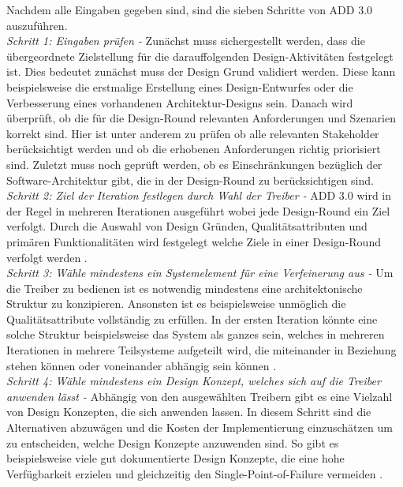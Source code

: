 Nachdem alle Eingaben gegeben sind, sind die sieben Schritte von ADD 3.0 auszuf\"uhren.\\

\emph{Schritt 1: Eingaben pr\"ufen -}
Zun\"achst muss sichergestellt werden, dass die \"ubergeordnete Zielstellung f\"ur die darauffolgenden Design-Aktivit\"aten festgelegt ist. Dies bedeutet zun\"achst muss der Design Grund validiert werden. Diese kann beispielsweise die erstmalige Erstellung eines Design-Entwurfes oder die Verbesserung eines vorhandenen Architektur-Designs sein. Danach wird \"uberpr\"uft, ob die f\"ur die Design-Round relevanten Anforderungen und Szenarien korrekt sind. Hier ist unter anderem zu pr\"ufen ob alle relevanten Stakeholder ber\"ucksichtigt werden und ob die erhobenen Anforderungen richtig priorisiert sind. Zuletzt muss noch gepr\"uft werden, ob es Einschr\"ankungen bez\"uglich der Software-Architektur gibt, die in der Design-Round zu ber\"ucksichtigen sind.\\

\emph{Schritt 2: Ziel der Iteration festlegen durch Wahl der Treiber -}
ADD 3.0 wird in der Regel in mehreren Iterationen ausgef\"uhrt wobei jede Design-Round ein Ziel verfolgt. Durch die Auswahl von Design Gr\"unden, Qualit\"atsattributen und prim\"aren Funktionalit\"aten wird festgelegt welche Ziele in einer Design-Round verfolgt werden \cite{Cer01}.\\

\emph{Schritt 3: W\"ahle mindestens ein Systemelement f\"ur eine Verfeinerung aus -}
Um die Treiber zu bedienen ist es notwendig mindestens eine architektonische Struktur zu konzipieren. Ansonsten ist es beispielsweise unm\"oglich die Qualit\"atsattribute vollst\"andig zu erf\"ullen. In der ersten Iteration k\"onnte eine solche Struktur beispielsweise das System als ganzes sein, welches in mehreren Iterationen in mehrere Teilsysteme aufgeteilt wird, die miteinander in Beziehung stehen k\"onnen oder voneinander abh\"angig sein k\"onnen \cite{Cer01}.\\

\emph{Schritt 4: W\"ahle mindestens ein Design Konzept, welches sich auf die Treiber anwenden l\"asst -}
Abh\"angig von den ausgew\"ahlten Treibern gibt es eine Vielzahl von Design Konzepten, die sich anwenden lassen. In diesem Schritt sind die Alternativen abzuw\"agen und die Kosten der Implementierung einzusch\"atzen um zu entscheiden, welche Design Konzepte anzuwenden sind. So gibt es beispielsweise viele gut dokumentierte Design Konzepte, die eine hohe Verf\"ugbarkeit erzielen und gleichzeitig den Single-Point-of-Failure vermeiden \cite{Cer01}.\\

